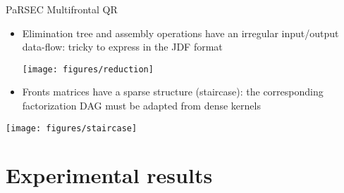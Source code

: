 \documentclass{beamer}
\newcommand{\db}[1]{\textcolor{amblu}{#1}}
\begin{document}
\begin{frame}{PaRSEC Multifrontal QR}
  

  \begin{itemize}  
  \item \db{Elimination tree} and \db{assembly operations} have an
    irregular input/output data-flow: tricky to express in the JDF
    format

  \begin{center}
    \texttt{[image: figures/reduction]}%
  \end{center}

  \item Fronts matrices have a \db{sparse structure} (staircase):
    the corresponding factorization DAG must be adapted from dense
    kernels
  \end{itemize}

  \begin{center}
    \texttt{[image: figures/staircase]}%
  \end{center}
\end{frame}

\part{Experimental results}

\end{document}

